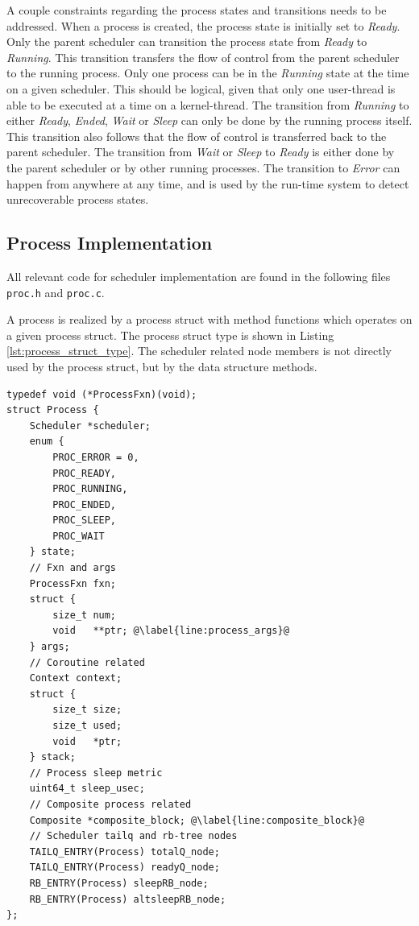 A couple constraints regarding the process states and transitions needs to be addressed. When a process is created, the process state is initially set to \textit{Ready}. Only the parent scheduler can transition the process state from \textit{Ready} to \textit{Running}. This transition transfers the flow of control from the parent scheduler to the running process. Only one process can be in the \textit{Running} state at the time on a given scheduler. This should be logical, given that only one user\hyp{}thread is able to be executed at a time on a kernel\hyp{}thread. The transition from \textit{Running} to either \textit{Ready}, \textit{Ended}, \textit{Wait} or \textit{Sleep} can only be done by the running process itself. This transition also follows that the flow of control is transferred back to the parent scheduler. The transition from \textit{Wait} or \textit{Sleep} to \textit{Ready} is either done by the parent scheduler or by other running processes. The transition to \textit{Error} can happen from anywhere at any time, and is used by the run\hyp{}time system to detect unrecoverable process states.


\subsection{Process Implementation}
\label{subsec:process_impl}

All relevant code for scheduler implementation are found in the following files \texttt{proc.h} and \texttt{proc.c}.

A process is realized by a process struct with method functions which operates on a given process struct. The process struct type is shown in Listing \ref{lst:process_struct_type}. The scheduler related node members is not directly used by the process struct, but by the data structure methods.

\noindent\begin{minipage}{\textwidth}
\begin{lstlisting}[style={CustomC},caption={Process struct type},label={lst:process_struct_type}]
typedef void (*ProcessFxn)(void);
struct Process {
    Scheduler *scheduler;
    enum {
        PROC_ERROR = 0,
        PROC_READY,
        PROC_RUNNING,
        PROC_ENDED,
        PROC_SLEEP,
        PROC_WAIT
    } state;
    // Fxn and args 
    ProcessFxn fxn;
    struct {
        size_t num;
        void   **ptr; @\label{line:process_args}@
    } args;
    // Coroutine related
    Context context;
    struct {
        size_t size;
        size_t used;
        void   *ptr;
    } stack;
    // Process sleep metric
    uint64_t sleep_usec;
    // Composite process related
    Composite *composite_block; @\label{line:composite_block}@
    // Scheduler tailq and rb-tree nodes
    TAILQ_ENTRY(Process) totalQ_node;
    TAILQ_ENTRY(Process) readyQ_node;
    RB_ENTRY(Process) sleepRB_node;
    RB_ENTRY(Process) altsleepRB_node;
};
\end{lstlisting}
\end{minipage}

